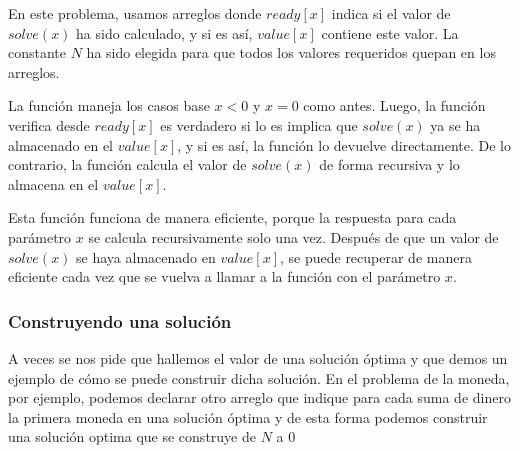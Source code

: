 En este problema, usamos arreglos donde $ready[x]$ indica si el valor de $solve(x)$ ha sido calculado, y si es así, $value[x]$ contiene este valor. La constante $N$ ha sido elegida para que todos los valores requeridos quepan en los arreglos.

La función maneja los casos base $x < 0$ y $x = 0$ como antes. Luego, la función verifica desde  $ready[x]$ es verdadero si lo es implica que $solve(x)$ ya se ha almacenado en el $value[x]$, y si es así, la función lo devuelve directamente. De lo contrario, la función calcula el valor de $solve(x)$ de forma recursiva y lo almacena en el $value[x]$.

Esta función funciona de manera eficiente, porque la respuesta para cada parámetro $x$ se calcula recursivamente solo una vez. Después de que un valor de $solve(x)$ se haya almacenado en $value[x]$, se puede recuperar de manera eficiente cada vez que se vuelva a llamar a la función con el parámetro $x$. 

\subsubsection{Construyendo una solución}

A veces se nos pide que hallemos el valor de una solución óptima y que demos un ejemplo de cómo se puede construir dicha solución. En el problema de la moneda, por ejemplo, podemos declarar otro arreglo que indique para cada suma de dinero la primera moneda en una solución óptima y de esta forma podemos construir una solución optima que se construye de $N$ a $0$
